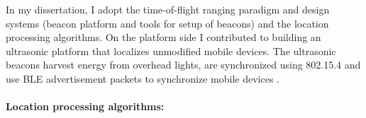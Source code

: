 \documentclass[10pt]{article}
\begin{document}
In my dissertation, I adopt the time-of-flight ranging paradigm and design systems (beacon platform and tools for setup of beacons) and the location processing algorithms. %
On the platform side I contributed to building an ultrasonic platform that localizes unmodified mobile devices. The ultrasonic beacons harvest energy from overhead lights, are synchronized using 802.15.4 and use BLE advertisement packets to synchronize mobile devices
\cite{rtas-alps-platform, lazik2015alps,lazik2015alpsdemo}. 

\paragraph{Location processing algorithms: }
\end{document}
